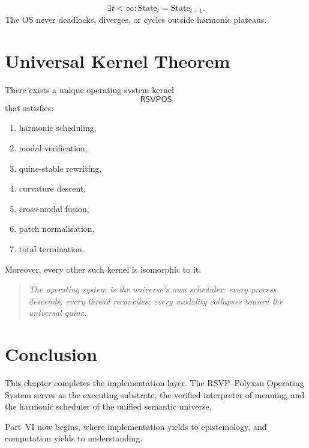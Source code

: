 \begin{corollary}
\[
\exists t < \infty : \mathrm{State}_t = \mathrm{State}_{t+1}.
\]
The OS never deadlocks, diverges, or cycles outside harmonic plateaus.
\end{corollary}

\section{Universal Kernel Theorem}
\label{sec:60:universal}

\begin{theorem}
There exists a unique operating system kernel
\[
\mathsf{RSVPOS}
\]
that satisfies:
\begin{enumerate}
  \item harmonic scheduling,
  \item modal verification,
  \item quine-stable rewriting,
  \item curvature descent,
  \item cross-modal fusion,
  \item patch normalisation,
  \item total termination.
\end{enumerate}
Moreover, every other such kernel is isomorphic to it.
\end{theorem}

\begin{quote}
\textit{
The operating system is the universe’s own scheduler:  
every process descends; every thread reconciles;  
every modality collapses toward the universal quine.}
\end{quote}

\section{Conclusion}
\label{sec:60:conclusion}

This chapter completes the implementation layer.  
The RSVP--Polyxan Operating System serves as the executing substrate,
the verified interpreter of meaning,  
and the harmonic scheduler of the unified semantic universe.

Part~VI now begins,  
where implementation yields to epistemology,  
and computation yields to understanding.

